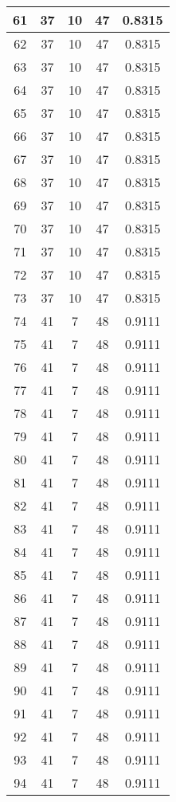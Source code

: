\documentclass[letterpaper, 12pt]{article}
\begin{document}
\begin{longtable}{|c|c|c|c|c|}
\hline
61 & 37 & 10 & 47 & 0.8315 \\
\hline
62 & 37 & 10 & 47 & 0.8315 \\
\hline
63 & 37 & 10 & 47 & 0.8315 \\
\hline
64 & 37 & 10 & 47 & 0.8315 \\
\hline
65 & 37 & 10 & 47 & 0.8315 \\
\hline
66 & 37 & 10 & 47 & 0.8315 \\
\hline
67 & 37 & 10 & 47 & 0.8315 \\
\hline
68 & 37 & 10 & 47 & 0.8315 \\
\hline
69 & 37 & 10 & 47 & 0.8315 \\
\hline
70 & 37 & 10 & 47 & 0.8315 \\
\hline
71 & 37 & 10 & 47 & 0.8315 \\
\hline
72 & 37 & 10 & 47 & 0.8315 \\
\hline
73 & 37 & 10 & 47 & 0.8315 \\
\hline
74 & 41 & 7 & 48 & 0.9111 \\
\hline
75 & 41 & 7 & 48 & 0.9111 \\
\hline
76 & 41 & 7 & 48 & 0.9111 \\
\hline
77 & 41 & 7 & 48 & 0.9111 \\
\hline
78 & 41 & 7 & 48 & 0.9111 \\
\hline
79 & 41 & 7 & 48 & 0.9111 \\
\hline
80 & 41 & 7 & 48 & 0.9111 \\
\hline
81 & 41 & 7 & 48 & 0.9111 \\
\hline
82 & 41 & 7 & 48 & 0.9111 \\
\hline
83 & 41 & 7 & 48 & 0.9111 \\
\hline
84 & 41 & 7 & 48 & 0.9111 \\
\hline
85 & 41 & 7 & 48 & 0.9111 \\
\hline
86 & 41 & 7 & 48 & 0.9111 \\
\hline
87 & 41 & 7 & 48 & 0.9111 \\
\hline
88 & 41 & 7 & 48 & 0.9111 \\
\hline
89 & 41 & 7 & 48 & 0.9111 \\
\hline
90 & 41 & 7 & 48 & 0.9111 \\
\hline
91 & 41 & 7 & 48 & 0.9111 \\
\hline
92 & 41 & 7 & 48 & 0.9111 \\
\hline
93 & 41 & 7 & 48 & 0.9111 \\
\hline
94 & 41 & 7 & 48 & 0.9111 \\
\hline

\end{longtable}
\end{document}
